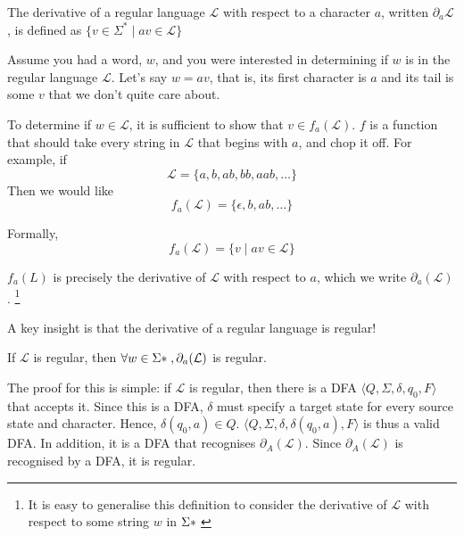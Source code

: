 \begin{definition}
    The derivative of a regular language $\mathcal{L}$ with respect to a character $a$, written $\partial_a \mathcal{L}$, is defined as $\{v \in \Sigma^{*} \mid av \in \mathcal{L} \}$
\end{definition}

Assume you had a word, $w$, and you were interested in determining if $w$ is in the regular language $\mathcal{L}$. Let's say $w = av$, that is, its first character is $a$ and its tail is some $v$ that we don't quite care about.

To determine if $w \in \mathcal{L}$, it is sufficient to show that $v \in f_a(\mathcal{L})$. $f$ is a function that should take every string in $\mathcal{L}$ that begins with $a$, and chop it off. For example, if \[\mathcal{L} = \{ a, b, ab, bb, aab, \ldots \}\] Then we would like \[f_a(\mathcal{L}) = \{ \epsilon, b, ab, \ldots\} \]

Formally, \[f_a(\mathcal{L}) = \{ v \mid av \in \mathcal{L}\}\]

$f_a(L)$ is precisely the derivative of $\mathcal{L}$ with respect to $a$, which we write $\partial_a(\mathcal{L})$. \footnote{It is easy to generalise this definition to consider the derivative of $\mathcal{L}$ with respect to some string $w$ in $\Sigma\*$}

A key insight is that the derivative of a regular language is regular!

\begin{theorem}
    \label{thm:closure-differentiation}
    If $\mathcal{L}$ is regular, then $\forall w \in \Sigma\*, \partial_a(\mathcal{L})$ is regular.
\end{theorem}

The proof for this is simple: if $\mathcal{L}$ is regular, then there is a DFA $\langle Q, \Sigma, \delta, q_0, F \rangle$ that accepts it. Since this is a DFA, $\delta$ must specify a target state for every source state and character. Hence, $\delta(q_0, a) \in Q$. $\langle Q, \Sigma, \delta, \delta(q_0, a), F \rangle$ is thus a valid DFA. In addition, it is a DFA that recognises $\partial_A(\mathcal{L})$. Since $\partial_A(\mathcal{L})$ is recognised by a DFA, it is regular.


